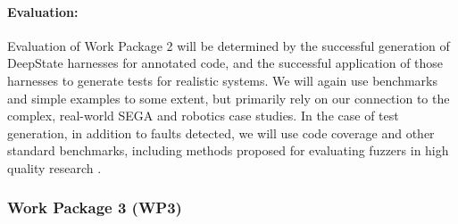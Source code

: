 \paragraph{Evaluation:} Evaluation of
Work Package 2 will be determined by the successful generation of
DeepState harnesses for \acsl annotated code, and the successful
application of those harnesses to generate tests for realistic
systems.  We will again use benchmarks and simple examples to some
extent, but primarily rely on our connection to the %
complex, real-world SEGA and robotics case studies.
In the case of test generation, in addition to faults
detected, we will use code coverage and other standard benchmarks,
including methods proposed for evaluating fuzzers in high quality
research \cite{FuzzerHicks}.


\subsubsection{Work Package 3 (WP3)}

